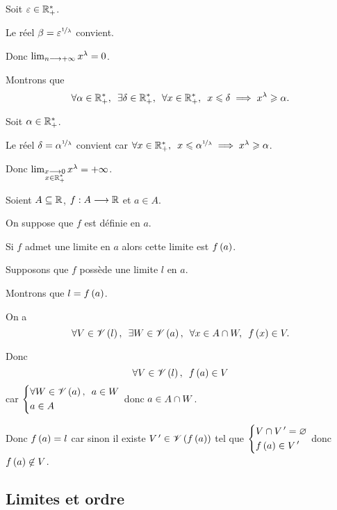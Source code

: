 \begin{dem}
Soit \(\epsilon\in\Rps\).

Le réel \(\beta=\epsilon^{\nicefrac{1}{\lambda}}\) convient.

Donc \(\lim_{n\to\pinf}x^\lambda=0\).

Montrons que \[\quantifs{\forall\alpha\in\Rps;\exists\delta\in\Rps;\forall x\in\Rps}x\leq\delta\imp x^\lambda\geq\alpha.\]

Soit \(\alpha\in\Rps\).

Le réel \(\delta=\alpha^{\nicefrac{1}{\lambda}}\) convient car \(\quantifs{\forall x\in\Rps}x\leq\alpha^{\nicefrac{1}{\lambda}}\imp x^\lambda\geq\alpha\).

Donc \(\lim_{\substack{x\to0 \\ x\in\Rps}}x^\lambda=\pinf\).
\end{dem}

\begin{rem}
Soient \(A\subset\R\), \(f:A\to\R\) et \(a\in A\).

On suppose que \(f\) est définie en \(a\).

Si \(f\) admet une limite en \(a\) alors cette limite est \(f\paren{a}\).
\end{rem}

\begin{dem}
Supposons que \(f\) possède une limite \(l\) en \(a\).

Montrons que \(l=f\paren{a}\).

On a \[\quantifs{\forall V\in\V{l};\exists W\in\V{a};\forall x\in A\inter W}f\paren{x}\in V.\]

Donc \[\quantifs{\forall V\in\V{l}}f\paren{a}\in V\] car \(\begin{dcases}\quantifs{\forall W\in\V{a}}a\in W \\ a\in A\end{dcases}\) donc \(a\in A\inter W\).

Donc \(f\paren{a}=l\) car sinon il existe \(V\prim\in\V{f\paren{a}}\) tel que \(\begin{dcases}V\inter V\prim=\ensvide \\ f\paren{a}\in V\prim\end{dcases}\) donc \(f\paren{a}\not\in V\).
\end{dem}

\subsection{Limites et ordre}

